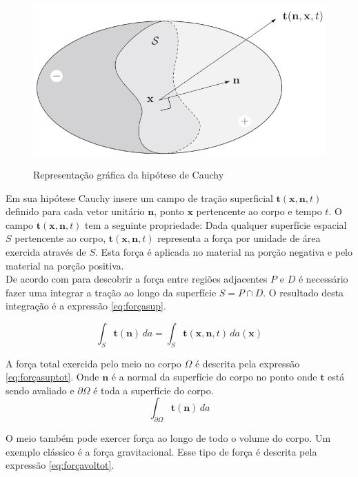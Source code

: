 \begin{figure}[H]
    \centering
    \caption{Representação gráfica da hipótese de Cauchy}
    \includegraphics[width = 0.7 \textwidth]{images/hipoteseCauchy.png}
    \label{fig:hipotesecauchy}
\end{figure}

Em sua hipótese Cauchy insere um campo de tração superficial $ \boldsymbol{t}(\boldsymbol{x, n},t) $ definido para cada vetor unitário $ \boldsymbol{n} $, ponto $ \boldsymbol{x} $ pertencente ao corpo e tempo $ t $. O campo $ \boldsymbol{t}(\boldsymbol{x, n},t) $ tem a seguinte propriedade: Dada qualquer superfície espacial $ S $ pertencente ao corpo, $ \boldsymbol{t}(\boldsymbol{x, n},t) $ representa a força por unidade de área exercida através de $ S $. Esta força é aplicada no material na porção negativa e pelo material na porção positiva. \\

De acordo com \cite{gurtin_fried_anand_2013} para descobrir a força entre regiões adjacentes $ P $ e $D$ é necessário fazer uma integrar a tração ao longo da superfície $ S=P\cap D $. O resultado desta integração é a expressão \ref{eq:forçasup}.

\begin{equation}
    \int_{S} \boldsymbol{t(n)}\, da = \int_{S} \boldsymbol{t}(\boldsymbol{x, n},t) \, da(\boldsymbol{x})
    \label{eq:forçasup}
\end{equation}

A força total exercida pelo meio no corpo $ \Omega $ é descrita pela expressão \ref{eq:forçasuptot}. Onde $\boldsymbol{n}$ é a normal da superfície do corpo no ponto onde $\boldsymbol{t}$ está sendo avaliado e $\partial \Omega$ é toda a superfície do corpo.
\begin{equation}
    \int_{\partial \Omega} \boldsymbol{t(n)} \, da
    \label{eq:forçasuptot}
\end{equation}

O meio também pode exercer força ao longo de todo o volume do corpo. Um exemplo clássico é a força gravitacional. Esse tipo de força é descrita pela expressão \ref{eq:forçavoltot}.


